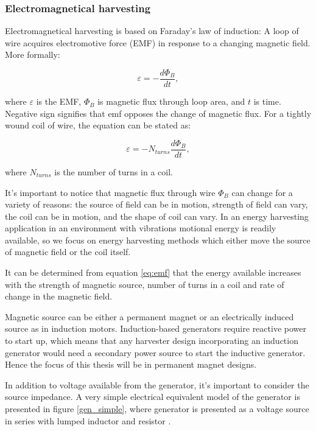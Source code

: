 \subsubsection{Electromagnetical harvesting}
Electromagnetical harvesting is based on Faraday's law of induction: A loop of wire acquires electromotive force (EMF) in response to a changing magnetic field. More formally:

\begin{equation}
  \varepsilon = - \frac{d \Phi_ {B}}{d t} , 
\end{equation}

where $\varepsilon$ is the EMF, $\Phi_{B}$ is magnetic flux through loop area, and $t$ is time. Negative sign signifies that emf opposes the change of magnetic flux. For a tightly wound coil of wire, the equation can be stated as: 

\begin{equation} \label{eq:emf}
  \varepsilon = -N_{turns} \frac{d \Phi_{B}}{d t} , 
\end{equation}

where $N_{turns}$ is the number of turns in a coil. \cite[p.999]{universityphysics}

It's important to notice that magnetic flux through wire $ \Phi_{B} $ can change for a variety of reasons: the source of field can be in motion, strength of field can vary, the coil can be in motion, and the shape of coil can vary. In an energy harvesting application in an environment with vibrations motional energy is readily available, so we focus on energy harvesting methods which either move the source of magnetic field or the coil itself.

It can be determined from equation \eqref{eq:emf} that the energy available increases with the strength of magnetic source, number of turns in a coil and rate of change in the magnetic field. 

Magnetic source can be either a permanent magnet or an electrically induced source as in induction motors. Induction-based generators require reactive power to start up, which means that any harvester design incorporating an induction generator would need a secondary power source to start the inductive generator. Hence the focus of this thesis will be in permanent magnet designs.

In addition to voltage available from the generator, it's important to consider the source impedance. A very simple electrical equivalent model of the generator is presented in figure \ref{gen_simple}, where generator is presented as a voltage source in series with lumped inductor and resistor \cite{Jirutitijaroen2012}. 

